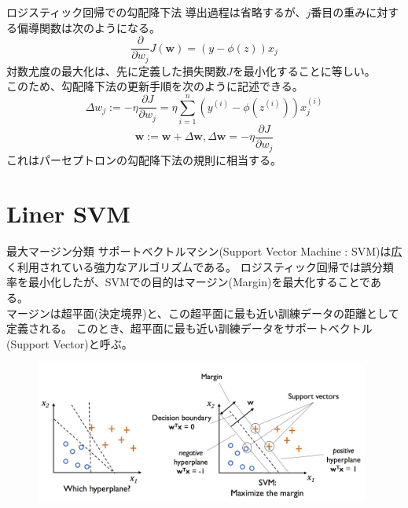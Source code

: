 \documentclass[aspectratio=169, dvipdfmx, 11pt]{beamer} %
\begin{document}
\begin{frame}{ロジスティック回帰での勾配降下法}
    導出過程は省略するが、\(j\)番目の重みに対する偏導関数は次のようになる。
    \begin{equation*}
        \frac{\partial}{\partial w_j}J(\textbf{w}) = (y - \phi(z))x_j
    \end{equation*}
    対数尤度の最大化は、先に定義した損失関数\(J\)を最小化することに等しい。\\
    このため、勾配降下法の更新手順を次のように記述できる。
    \begin{equation*}
        \Delta w_j := - \eta \frac{\partial J}{\partial w_j} 
        = \eta \sum_{i=1}^{n} (y^{(i)} - \phi(z^{(i)}))x_{j}^{(i)}
    \end{equation*}
    \begin{equation*}
        \textbf{w} := \textbf{w} + \Delta \textbf{w}, \Delta \textbf{w} = - \eta \frac{\partial J}{\partial w_j} 
    \end{equation*}
    これはパーセプトロンの勾配降下法の規則に相当する。
\end{frame}

\section{Liner SVM}
\begin{frame}{最大マージン分類}
    サポートベクトルマシン(Support Vector Machine : SVM)は広く利用されている強力なアルゴリズムである。
    ロジスティック回帰では誤分類率を最小化したが、SVMでの目的はマージン(Margin)を最大化することである。\\
    マージンは超平面(決定境界)と、この超平面に最も近い訓練データの距離として定義される。
    このとき、超平面に最も近い訓練データをサポートベクトル(Support Vector)と呼ぶ。
    \begin{figure}[b]
        \begin{center}
        \includegraphics[width=110mm]{img/day02/fig05.png}
        \end{center}
    \end{figure}
\end{frame}
\end{document}
